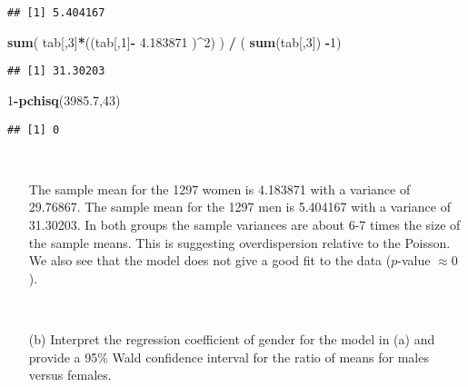 \documentclass[]{article}
\newenvironment{Shaded}{\begin{snugshade}}{\end{snugshade}}
\newcommand{\KeywordTok}[1]{\textcolor[rgb]{0.13,0.29,0.53}{\textbf{#1}}}
\newcommand{\DecValTok}[1]{\textcolor[rgb]{0.00,0.00,0.81}{#1}}
\newcommand{\FloatTok}[1]{\textcolor[rgb]{0.00,0.00,0.81}{#1}}
\newcommand{\StringTok}[1]{\textcolor[rgb]{0.31,0.60,0.02}{#1}}
\newcommand{\OperatorTok}[1]{\textcolor[rgb]{0.81,0.36,0.00}{\textbf{#1}}}
\newcommand{\NormalTok}[1]{#1}
\begin{document}
\begin{verbatim}
## [1] 5.404167
\end{verbatim}

\begin{Shaded}
\begin{Highlighting}[]
\KeywordTok{sum}\NormalTok{( tab[,}\DecValTok{3}\NormalTok{]}\OperatorTok{*}\NormalTok{((tab[,}\DecValTok{1}\NormalTok{]}\OperatorTok{-}\StringTok{ }\FloatTok{4.183871}\NormalTok{ )}\OperatorTok{^}\DecValTok{2}\NormalTok{) ) }\OperatorTok{/}\StringTok{ }\NormalTok{( }\KeywordTok{sum}\NormalTok{(tab[,}\DecValTok{3}\NormalTok{]) }\OperatorTok{-}\DecValTok{1}\NormalTok{)}
\end{Highlighting}
\end{Shaded}

\begin{verbatim}
## [1] 31.30203
\end{verbatim}

\begin{Shaded}
\begin{Highlighting}[]
\DecValTok{1}\OperatorTok{-}\KeywordTok{pchisq}\NormalTok{(}\FloatTok{3985.7}\NormalTok{,}\DecValTok{43}\NormalTok{)}
\end{Highlighting}
\end{Shaded}

\begin{verbatim}
## [1] 0
\end{verbatim}

~

\begin{itemize}
     \item[]   The sample mean for the 1297 women is 4.183871 with a variance of 29.76867. The sample mean for the 1297 men is 5.404167 with a variance of 31.30203. In both groups the sample variances are about 6-7 times the size of the sample means. This is suggesting overdispersion relative to the Poisson. We also see that the model does not give a good fit to the data ($p$-value $\approx0$).


 \end{itemize}

~

\begin{itemize}
     \item[(b)] Interpret the regression coefficient of gender for the model in (a) and provide a 95\% Wald confidence interval for the ratio of means for males versus females.

 \end{itemize}
\end{document}
